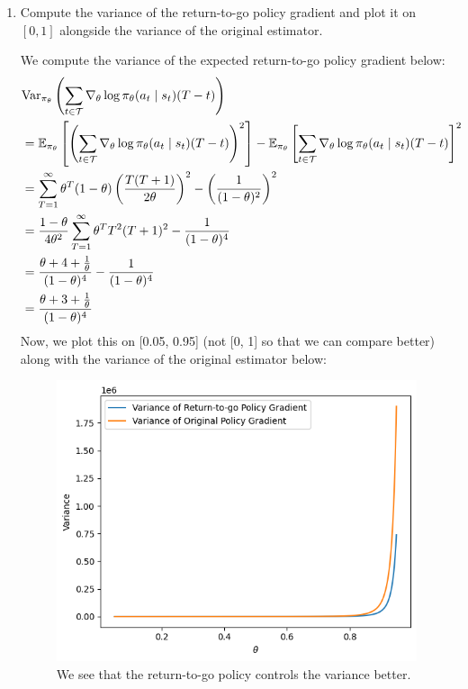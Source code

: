 \documentclass{article}
\begin{document}
\begin{enumerate}
\begin{enumerate}
    \item Compute the variance of the return-to-go policy gradient and plot it on $[0, 1]$ alongside the variance of the original estimator.

    \begin{sol}
        We compute the variance of the expected return-to-go policy gradient below:
    \begin{align*}
&\text{Var}_{\pi_\theta}\left(\sum_{t \in \mathcal{T}} \nabla_\theta \log \pi_\theta(a_t \mid s_t) (T - t)\right) \\
&= \mathbb{E}_{\pi_\theta} \left[\left(\sum_{t \in \mathcal{T}} \nabla_\theta \log \pi_\theta(a_t \mid s_t) (T - t)\right)^2\right] - \mathbb{E}_{\pi_\theta} \left[\sum_{t \in \mathcal{T}} \nabla_\theta \log \pi_\theta(a_t \mid s_t) (T - t)\right]^2 \\
&= \sum_{T=1}^\infty \theta^T (1 - \theta) \left(\frac{T (T+1)}{2\theta}\right)^2  - \left(\frac{1}{(1 - \theta)^2}\right)^2\\
&= \frac{1 - \theta}{4\theta^2} \sum_{T=1}^\infty \theta^T T^2(T+1)^2 - \frac{1}{(1 - \theta)^4} \\
&= \frac{\theta + 4 + \frac{1}{\theta}}{(1 - \theta)^4} - \frac{1}{(1 - \theta)^4} \\
&= \frac{\theta + 3 + \frac{1}{\theta}}{(1 - \theta)^4}
    \end{align*}
    Now, we plot this on [0.05, 0.95] (not [0, 1] so that we can compare better) along with the variance of the original estimator below:
    \begin{figure}[h!]
        \begin{center}
        \includegraphics[width=\textwidth*2/3]{q8.3b.png}
        \end{center}
        \caption{\color{darkblue} We see that the return-to-go policy controls the variance better.}
    \end{figure}


\end{sol}
\end{enumerate}
\end{enumerate}
\end{document}
